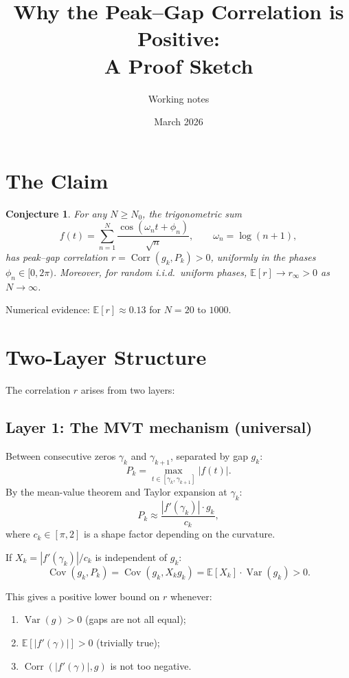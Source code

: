 \documentclass[11pt]{article}
\title{Why the Peak--Gap Correlation is Positive:\\A Proof Sketch}
\author{Working notes}
\date{March 2026}
\newtheorem{conjecture}[theorem]{Conjecture}
\DeclareMathOperator{\Corr}{Corr}
\DeclareMathOperator{\Cov}{Cov}
\DeclareMathOperator{\Var}{Var}
\begin{document}
\maketitle

\section{The Claim}

\begin{conjecture}\label{conj:main}
For any $N \geq N_0$, the trigonometric sum
\[
f(t) = \sum_{n=1}^{N} \frac{\cos(\omega_n t + \phi_n)}{\sqrt{n}},
\qquad \omega_n = \log(n+1),
\]
has peak--gap correlation $r = \Corr(g_k, P_k) > 0$, uniformly in the phases $\phi_n \in [0, 2\pi)$.
Moreover, for random i.i.d.\ uniform phases, $\mathbb{E}[r] \to r_\infty > 0$ as $N \to \infty$.
\end{conjecture}

\noindent
Numerical evidence: $\mathbb{E}[r] \approx 0.13$ for $N = 20$ to $1000$.

\section{Two-Layer Structure}

The correlation $r$ arises from two layers:

\subsection{Layer 1: The MVT mechanism (universal)}
Between consecutive zeros $\gamma_k$ and $\gamma_{k+1}$, separated by gap $g_k$:
\[
P_k = \max_{t \in [\gamma_k, \gamma_{k+1}]} |f(t)|.
\]
By the mean-value theorem and Taylor expansion at $\gamma_k$:
\[
P_k \approx \frac{|f'(\gamma_k)| \cdot g_k}{c_k},
\]
where $c_k \in [\pi, 2]$ is a shape factor depending on the curvature.

If $X_k = |f'(\gamma_k)|/c_k$ is independent of $g_k$:
\[
\Cov(g_k, P_k) = \Cov(g_k, X_k g_k) = \mathbb{E}[X_k] \cdot \Var(g_k) > 0.
\]

This gives a positive lower bound on $r$ whenever:
\begin{enumerate}
\item $\Var(g) > 0$ (gaps are not all equal);
\item $\mathbb{E}[|f'(\gamma)|] > 0$ (trivially true);
\item $\Corr(|f'(\gamma)|, g)$ is not too negative.
\end{enumerate}
\end{document}
